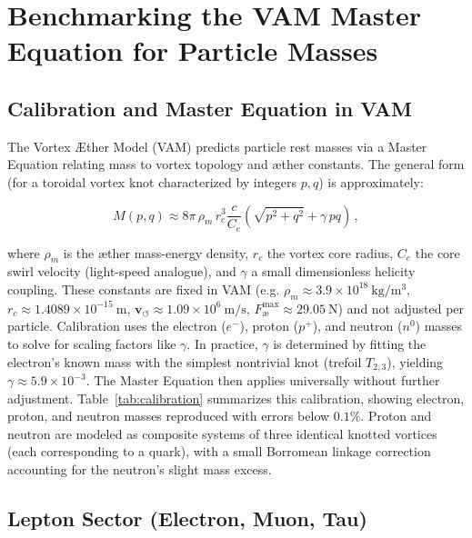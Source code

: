 \section{Benchmarking the VAM Master Equation for Particle Masses}

\subsection{Calibration and Master Equation in VAM}

The Vortex Æther Model (VAM) predicts particle rest masses via a Master Equation relating mass to vortex topology and æther constants. The general form (for a toroidal vortex knot characterized by integers $p,q$) is approximately:

\[
    M(p,q) \approx 8\pi \,\rho_{\scriptscriptstyle\boldsymbol\!m} \, r_c^3 \frac{c}{C_e} \left( \sqrt{p^2 + q^2} + \gamma \, p q \right) \,,
\]

where $\rho_{\scriptscriptstyle\boldsymbol\!m}$ is the æther mass-energy density, $r_c$ the vortex core radius, $C_e$ the core swirl velocity (light-speed analogue), and $\gamma$ a small dimensionless helicity coupling. These constants are fixed in VAM (e.g. $\rho_{\scriptscriptstyle\boldsymbol\!m} \approx 3.9 \times 10^{18}~\mathrm{kg/m^3}$, $r_c \approx 1.4089 \times 10^{-15}~\mathrm{m}$, $\mathbf{v}_{\scriptscriptstyle\boldsymbol{\circlearrowleft}} \approx 1.09 \times 10^6~\mathrm{m/s}$, $F^{\max}_{\text{\ae}} \approx 29.05~\mathrm{N}$) and not adjusted per particle. Calibration uses the electron ($e^-$), proton ($p^+$), and neutron ($n^0$) masses to solve for scaling factors like $\gamma$. In practice, $\gamma$ is determined by fitting the electron’s known mass with the simplest nontrivial knot (trefoil $T_{2,3}$), yielding $\gamma \approx 5.9 \times 10^{-3}$. The Master Equation then applies universally without further adjustment. Table~\ref{tab:calibration} summarizes this calibration, showing electron, proton, and neutron masses reproduced with errors below $0.1\%$. Proton and neutron are modeled as composite systems of three identical knotted vortices (each corresponding to a quark), with a small Borromean linkage correction accounting for the neutron’s slight mass excess.

\subsection{Lepton Sector (Electron, Muon, Tau)}

